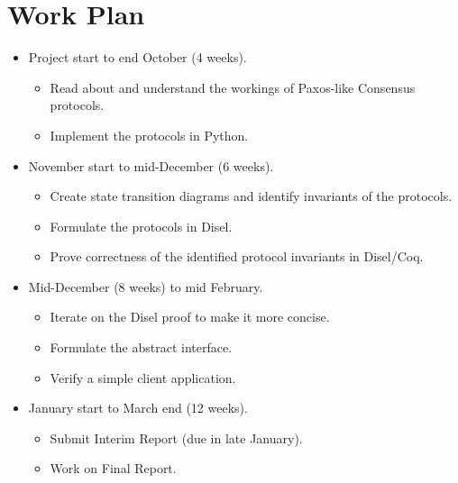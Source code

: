 \section{Work Plan}
\begin{itemize}
\itemsep0em
  \item Project start to end October (4 weeks).
    \begin{itemize}
      \item Read about and understand the workings of Paxos-like Consensus protocols.
      \item Implement the protocols in Python.
    \end{itemize}
  \item November start to mid-December (6 weeks).
    \begin{itemize}
      \item Create state transition diagrams and identify invariants of the protocols.
      \item Formulate the protocols in Disel.
      \item Prove correctness of the identified protocol invariants in Disel/Coq.
    \end{itemize}
  \item Mid-December (8 weeks) to mid February.
    \begin{itemize}
      \item Iterate on the Disel proof to make it more concise.
      \item Formulate the abstract interface.
      \item Verify a simple client application.
    \end{itemize}
  \item January start to March end (12 weeks).
    \begin{itemize}
      \item Submit Interim Report (due in late January).
      \item Work on Final Report.
    \end{itemize}
\end{itemize}
